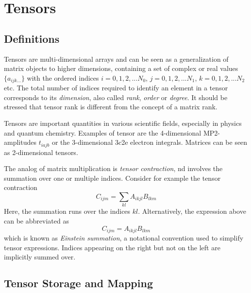 
\section{Tensors}

\subsection{Definitions}

Tensors are multi-dimensional arrays and can be seen as a generalization of matrix objects to higher dimensions, containing a set of complex or real values $\{a_{ijk...}\}$ with the ordered indices $i = 0,1,2,...N_0$, $j = 0,1,2,...N_1$, $k = 0,1,2,...N_2$ etc. The total number of indices required to identify an element in a tensor corresponds to its \emph{dimension}, also called \emph{rank}, \emph{order} or \emph{degree}. It should be stressed that tensor rank is different from the concept of a matrix rank. 

Tensors are important quantities in various scientific fields, especially in physics and quantum chemistry. Examples of tensor are the 4-dimensional MP2-amplitudes $t_{iajb}$ or the 3-dimensional 3c2e electron integrals. Matrices can be seen as 2-dimensional tensors. 

The analog of matrix multiplication is \emph{tensor contraction}, nd involves the summation over one or multiple indices. Consider for example the tensor contraction
\begin{equation}
C_{ijm} = \sum_{kl} A_{ikjl} B_{lkm}
\end{equation}
\noindent Here, the summation runs over the indices $kl$. Alternatively, the expression above can be abbreviated as
\begin{equation}
C_{ijm} = A_{ikjl} B_{lkm}
\label{eq:TENEX}
\end{equation}
\noindent which is known as  \emph{Einstein summation}, a notational convention used to simplify tensor expressions. Indices appearing on the right but not on the left are implicitly summed over. 

\subsection{Tensor Storage and Mapping}


